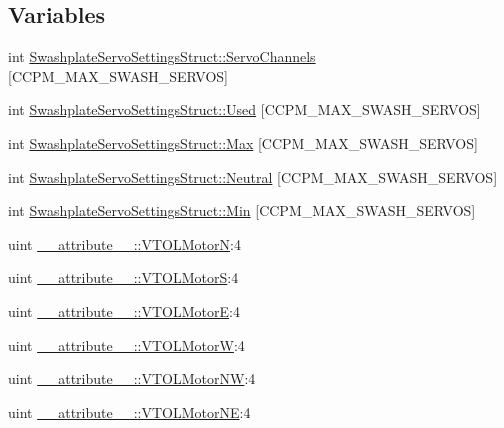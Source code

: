 \subsection*{\-Variables}
\begin{DoxyCompactItemize}
\item 
int \hyperlink{group___config_plugin_ga86e55bfb2e22af5cf453931b3990d504}{\-Swashplate\-Servo\-Settings\-Struct\-::\-Servo\-Channels} \mbox{[}\-C\-C\-P\-M\-\_\-\-M\-A\-X\-\_\-\-S\-W\-A\-S\-H\-\_\-\-S\-E\-R\-V\-O\-S\mbox{]}
\item 
int \hyperlink{group___config_plugin_ga9fda1ee21effccd7fcbad04816734eac}{\-Swashplate\-Servo\-Settings\-Struct\-::\-Used} \mbox{[}\-C\-C\-P\-M\-\_\-\-M\-A\-X\-\_\-\-S\-W\-A\-S\-H\-\_\-\-S\-E\-R\-V\-O\-S\mbox{]}
\item 
int \hyperlink{group___config_plugin_ga30259c7dfef707f2d0999fed8adaf6b1}{\-Swashplate\-Servo\-Settings\-Struct\-::\-Max} \mbox{[}\-C\-C\-P\-M\-\_\-\-M\-A\-X\-\_\-\-S\-W\-A\-S\-H\-\_\-\-S\-E\-R\-V\-O\-S\mbox{]}
\item 
int \hyperlink{group___config_plugin_gad228ac505087eafb0d00d4aab3b3e76d}{\-Swashplate\-Servo\-Settings\-Struct\-::\-Neutral} \mbox{[}\-C\-C\-P\-M\-\_\-\-M\-A\-X\-\_\-\-S\-W\-A\-S\-H\-\_\-\-S\-E\-R\-V\-O\-S\mbox{]}
\item 
int \hyperlink{group___config_plugin_ga68b64812e9062f2c280eebb8ad8961c4}{\-Swashplate\-Servo\-Settings\-Struct\-::\-Min} \mbox{[}\-C\-C\-P\-M\-\_\-\-M\-A\-X\-\_\-\-S\-W\-A\-S\-H\-\_\-\-S\-E\-R\-V\-O\-S\mbox{]}
\item 
uint \hyperlink{group___config_plugin_ga2f7517413dcc58e5033f5b558c2645b6}{\-\_\-\-\_\-attribute\-\_\-\-\_\-\-::\-V\-T\-O\-L\-Motor\-N}\-:4
\item 
uint \hyperlink{group___config_plugin_ga454ee04b612bfb51636328cac0ecb30c}{\-\_\-\-\_\-attribute\-\_\-\-\_\-\-::\-V\-T\-O\-L\-Motor\-S}\-:4
\item 
uint \hyperlink{group___config_plugin_ga98abc446e1dcba498787f381659f6b2d}{\-\_\-\-\_\-attribute\-\_\-\-\_\-\-::\-V\-T\-O\-L\-Motor\-E}\-:4
\item 
uint \hyperlink{group___config_plugin_ga702b69e8ffd06d1a761e28540e0706c0}{\-\_\-\-\_\-attribute\-\_\-\-\_\-\-::\-V\-T\-O\-L\-Motor\-W}\-:4
\item 
uint \hyperlink{group___config_plugin_gaad074461234c2de58881eb8f2923e6e7}{\-\_\-\-\_\-attribute\-\_\-\-\_\-\-::\-V\-T\-O\-L\-Motor\-N\-W}\-:4
\item 
uint \hyperlink{group___config_plugin_gab2efff1f0b5cdb98443f986d78f75691}{\-\_\-\-\_\-attribute\-\_\-\-\_\-\-::\-V\-T\-O\-L\-Motor\-N\-E}\-:4

\end{DoxyCompactItemize}
